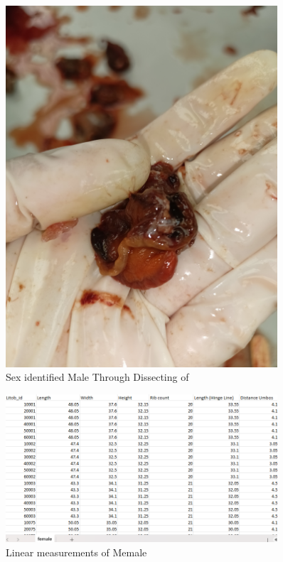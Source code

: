 \begin{figure}[!htbp]
	\centering
	\includegraphics[width=0.9\textwidth]{figures/dissecting male.jpg}
	\caption{Sex identified Male Through Dissecting of \Tegillarcagranosa}
\end{figure}


\begin{figure}[!htbp]
	\centering
	\includegraphics[width=0.9\textwidth]{figures/female_dataset.png}
	\caption{Linear measurements of Memale \Tegillarcagranosa}
\end{figure}

